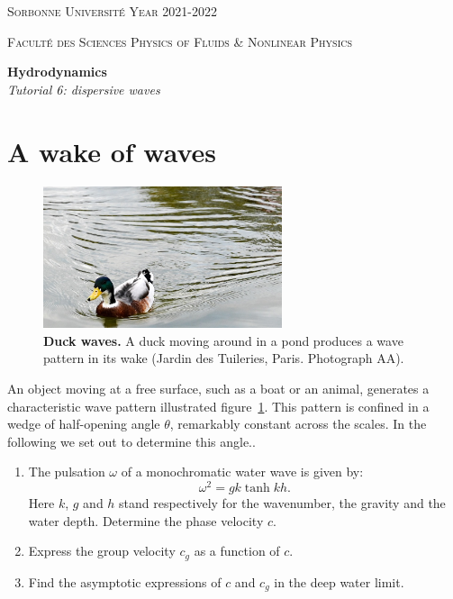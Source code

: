 \documentclass[11pt,a4paper]{article}
\begin{document}
\setlength{\unitlength}{1cm}
\noindent
\parbox{\textwidth}{
\textsc{
Sorbonne Université  
\hfill
Year 2021-2022
}
}
\parbox{\textwidth}{
\textsc{
Faculté des Sciences
\hfill
Physics of Fluids \& Nonlinear Physics
}
}

\begin{center}
\Large
\textbf{Hydrodynamics} \\ 
\textsl{Tutorial 6: dispersive waves} \\[1ex]
\end{center}

\section{A wake of waves}
\togglefalse{corrige}

\begin{figure}[ht]
    \centering
    \includegraphics[width=7cm]{duck_wave_pattern.jpg}
    \caption{\textbf{Duck waves.} A duck moving around in a pond produces a wave pattern in its wake (Jardin des Tuileries, Paris. Photograph AA).}
    \label{fig:wave_pattern}
\end{figure}
An object moving at a free surface, such as a boat or an animal, generates a characteristic wave pattern illustrated figure~\ref{fig:wave_pattern}. This pattern is confined in a wedge of half-opening angle $\theta$, remarkably constant across the scales. In the following we set out to determine this angle..
\begin{enumerate}
\item The pulsation $\omega$ of a monochromatic water wave is given by:
\begin{equation}
\omega^2=gk\tanh kh.
\end{equation}
Here $k$, $g$ and $h$ stand respectively for the wavenumber, the gravity and the water depth.
Determine the phase velocity $c$.
\item Express the group velocity $c_g$ as a function of $c$.
\item Find the asymptotic expressions of $c$ and $c_g$ in the deep water limit.
\end{enumerate}
\end{document}
